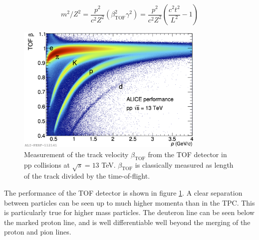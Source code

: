 \begin{equation}\label{eq:TOFm2}
    m^2/Z^2 = \frac{p^2}{c^2 Z^2}\left(\beta_{\mathrm{TOF}}^2\gamma^2 \right) = \frac{p^2}{c^2 Z^2} \left( \frac{c^2t^2}{L^2} -1\right)
\end{equation}

\begin{figure}
    \centering
    \includegraphics[width=0.8\textwidth]{figures/2016-Sep-08-beta.png}
    \caption{Measurement of the track velocity $\beta_{\mathrm{TOF}}$ from the TOF detector in pp collisions at $\sqrt{s}=13$ TeV. $\beta_{\mathrm{TOF}}$ is classically measured as length of the track divided by the time-of-flight.}
    \label{fig:TOF_performance}
\end{figure}

The performance of the TOF detector is shown in figure \ref{fig:TOF_performance}. A clear separation between particles can be seen up to much higher momenta than in the TPC. This is particularly true for higher mass particles. The deuteron line can be seen below the marked proton line, and is well differentiable well beyond the merging of the proton and pion lines. 



